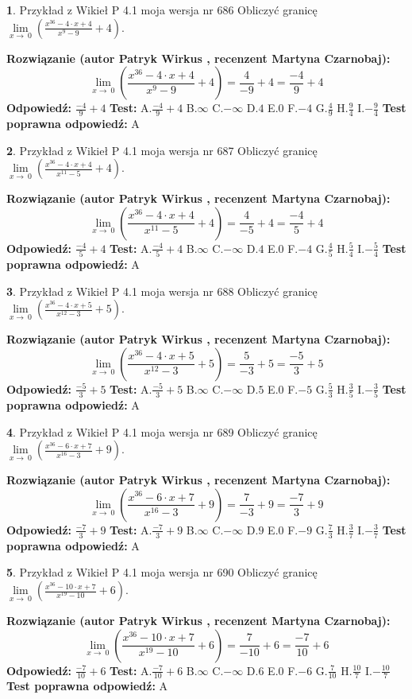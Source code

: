 \documentclass[12pt, a4paper]{article}
\theoremstyle{definition} %
\newtheorem{zad}{}
\newcommand{\zadStart}[1]{\begin{zad}#1\newline}
\newcommand{\zadStop}{\end{zad}}
\newcommand{\rozwStart}[2]{\noindent \textbf{Rozwiązanie (autor #1 , recenzent #2): }\newline}
\newcommand{\rozwStop}{\newline}
\newcommand{\odpStart}{\noindent \textbf{Odpowiedź:}\newline}
\newcommand{\odpStop}{\newline}
\newcommand{\testStart}{\noindent \textbf{Test:}\newline}
\newcommand{\testStop}{\newline}
\newcommand{\kluczStart}{\noindent \textbf{Test poprawna odpowiedź:}\newline}
\newcommand{\kluczStop}{\newline}
\begin{document}
\zadStart{Przykład z Wikieł P 4.1 moja wersja nr 686}
Obliczyć granicę $\lim\limits_{x\to\ 0}(\frac{x^{36}-4 \cdot x +4}{x^{9}-9}+4)$.
\zadStop
\rozwStart{Patryk Wirkus}{Martyna Czarnobaj}
$$\lim\limits_{x\to\ 0}(\frac{x^{36}-4 \cdot x +4}{x^{9}-9}+4)=\frac{4}{-9}+4=\frac{-4}{9}+4$$
\rozwStop
\odpStart
$\frac{-4}{9}+4$
\odpStop
\testStart
A.$\frac{-4}{9}+4$
B.$\infty$
C.$-\infty$
D.$4$
E.$0$
F.$-4$
G.$\frac{4}{9}$
H.$\frac{9}{4}$
I.$-\frac{9}{4}$
\testStop
\kluczStart
A
\kluczStop



\zadStart{Przykład z Wikieł P 4.1 moja wersja nr 687}
Obliczyć granicę $\lim\limits_{x\to\ 0}(\frac{x^{36}-4 \cdot x +4}{x^{11}-5}+4)$.
\zadStop
\rozwStart{Patryk Wirkus}{Martyna Czarnobaj}
$$\lim\limits_{x\to\ 0}(\frac{x^{36}-4 \cdot x +4}{x^{11}-5}+4)=\frac{4}{-5}+4=\frac{-4}{5}+4$$
\rozwStop
\odpStart
$\frac{-4}{5}+4$
\odpStop
\testStart
A.$\frac{-4}{5}+4$
B.$\infty$
C.$-\infty$
D.$4$
E.$0$
F.$-4$
G.$\frac{4}{5}$
H.$\frac{5}{4}$
I.$-\frac{5}{4}$
\testStop
\kluczStart
A
\kluczStop



\zadStart{Przykład z Wikieł P 4.1 moja wersja nr 688}
Obliczyć granicę $\lim\limits_{x\to\ 0}(\frac{x^{36}-4 \cdot x +5}{x^{12}-3}+5)$.
\zadStop
\rozwStart{Patryk Wirkus}{Martyna Czarnobaj}
$$\lim\limits_{x\to\ 0}(\frac{x^{36}-4 \cdot x +5}{x^{12}-3}+5)=\frac{5}{-3}+5=\frac{-5}{3}+5$$
\rozwStop
\odpStart
$\frac{-5}{3}+5$
\odpStop
\testStart
A.$\frac{-5}{3}+5$
B.$\infty$
C.$-\infty$
D.$5$
E.$0$
F.$-5$
G.$\frac{5}{3}$
H.$\frac{3}{5}$
I.$-\frac{3}{5}$
\testStop
\kluczStart
A
\kluczStop



\zadStart{Przykład z Wikieł P 4.1 moja wersja nr 689}
Obliczyć granicę $\lim\limits_{x\to\ 0}(\frac{x^{36}-6 \cdot x +7}{x^{16}-3}+9)$.
\zadStop
\rozwStart{Patryk Wirkus}{Martyna Czarnobaj}
$$\lim\limits_{x\to\ 0}(\frac{x^{36}-6 \cdot x +7}{x^{16}-3}+9)=\frac{7}{-3}+9=\frac{-7}{3}+9$$
\rozwStop
\odpStart
$\frac{-7}{3}+9$
\odpStop
\testStart
A.$\frac{-7}{3}+9$
B.$\infty$
C.$-\infty$
D.$9$
E.$0$
F.$-9$
G.$\frac{7}{3}$
H.$\frac{3}{7}$
I.$-\frac{3}{7}$
\testStop
\kluczStart
A
\kluczStop



\zadStart{Przykład z Wikieł P 4.1 moja wersja nr 690}
Obliczyć granicę $\lim\limits_{x\to\ 0}(\frac{x^{36}-10 \cdot x +7}{x^{19}-10}+6)$.
\zadStop
\rozwStart{Patryk Wirkus}{Martyna Czarnobaj}
$$\lim\limits_{x\to\ 0}(\frac{x^{36}-10 \cdot x +7}{x^{19}-10}+6)=\frac{7}{-10}+6=\frac{-7}{10}+6$$
\rozwStop
\odpStart
$\frac{-7}{10}+6$
\odpStop
\testStart
A.$\frac{-7}{10}+6$
B.$\infty$
C.$-\infty$
D.$6$
E.$0$
F.$-6$
G.$\frac{7}{10}$
H.$\frac{10}{7}$
I.$-\frac{10}{7}$
\testStop
\kluczStart
A
\kluczStop
\end{document}
